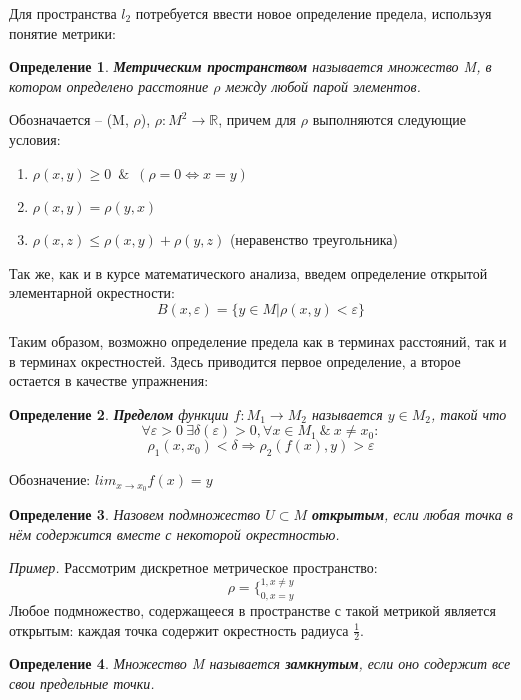 \documentclass[12pt]{article}
\newcommand{\example}{{\itshape Пример. }}
\newcommand{\equals}{\Leftrightarrow}
\renewcommand{\leq}{\leqslant}
\renewcommand{\geq}{\geqslant}
\newtheorem{defi}{Определение}[section]
\begin{document}
	Для пространства $l_2$ потребуется ввести новое определение предела, используя понятие метрики:
	
	\begin{defi}
		\textbf{Метрическим пространством} называется множество M, в котором определено расстояние $\rho$ между любой парой элементов. 
	\end{defi}
	
	Обозначается -- (M, $\rho$), $\rho : M^2 \rightarrow 
	\mathbb{R}$, причем для $\rho$ выполняются следующие условия:
	\begin{enumerate}
		\item $\rho(x,y) \geq 0$~$\&$~$(\rho = 0 \equals x=y)$
		\item $\rho(x,y) = \rho(y,x)$
		\item $\rho(x,z) \leq \rho(x,y) + \rho(y,z)$ (неравенство треугольника)
	\end{enumerate}
	
	Так же, как и в курсе математического анализа, введем определение открытой элементарной окрестности:
	$$B(x, \varepsilon) = \{y \in M | \rho(x,y) < \varepsilon\}$$
	
	Таким образом, возможно определение предела как в терминах расстояний, так и в терминах окрестностей. Здесь приводится первое 
	определение, а второе остается в качестве упражнения:
	
	\begin{defi}
		\textbf{Пределом} функции $f : M_1 \rightarrow M_2$ называется $y \in M_2$, такой что 
		$$\forall \varepsilon > 0 ~\exists 
		\delta(\varepsilon) > 0, \forall x \in M_1 ~\&~ x  \neq x_0 : $$
		$$\rho_1(x, x_0) < \delta \Rightarrow \rho_2(f(x), y) > \varepsilon$$
	\end{defi}
	
	Обозначение: $lim_{x \rightarrow x_0} f(x) = y$
	
	\begin{defi}
		Назовем подмножество $U \subset M$ \textbf{открытым}, если любая точка в нём содержится вместе с некоторой окрестностью.
	\end{defi}
	
	\example Рассмотрим дискретное метрическое пространство:
	$$\rho = \{^{1, x \neq y}_{0, x = y}$$
	Любое подмножество, содержащееся в пространстве с такой метрикой является открытым: каждая точка содержит окрестность радиуса 
	$\frac{1}{2}$.
	
	\begin{defi}
		Множество M называется \textbf{замкнутым}, если оно содержит все свои предельные точки.
	\end{defi}
	
\end{document}
